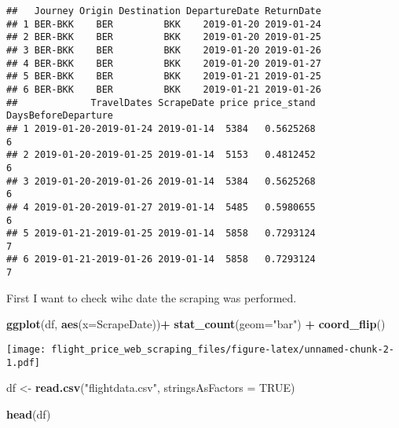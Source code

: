 \documentclass[]{article}
\newenvironment{Shaded}{\begin{snugshade}}{\end{snugshade}}
\newcommand{\KeywordTok}[1]{\textcolor[rgb]{0.13,0.29,0.53}{\textbf{#1}}}
\newcommand{\DataTypeTok}[1]{\textcolor[rgb]{0.13,0.29,0.53}{#1}}
\newcommand{\StringTok}[1]{\textcolor[rgb]{0.31,0.60,0.02}{#1}}
\newcommand{\OtherTok}[1]{\textcolor[rgb]{0.56,0.35,0.01}{#1}}
\newcommand{\OperatorTok}[1]{\textcolor[rgb]{0.81,0.36,0.00}{\textbf{#1}}}
\newcommand{\NormalTok}[1]{#1}
\begin{document}
\begin{verbatim}
##   Journey Origin Destination DepartureDate ReturnDate
## 1 BER-BKK    BER         BKK    2019-01-20 2019-01-24
## 2 BER-BKK    BER         BKK    2019-01-20 2019-01-25
## 3 BER-BKK    BER         BKK    2019-01-20 2019-01-26
## 4 BER-BKK    BER         BKK    2019-01-20 2019-01-27
## 5 BER-BKK    BER         BKK    2019-01-21 2019-01-25
## 6 BER-BKK    BER         BKK    2019-01-21 2019-01-26
##             TravelDates ScrapeDate price price_stand DaysBeforeDeparture
## 1 2019-01-20-2019-01-24 2019-01-14  5384   0.5625268                   6
## 2 2019-01-20-2019-01-25 2019-01-14  5153   0.4812452                   6
## 3 2019-01-20-2019-01-26 2019-01-14  5384   0.5625268                   6
## 4 2019-01-20-2019-01-27 2019-01-14  5485   0.5980655                   6
## 5 2019-01-21-2019-01-25 2019-01-14  5858   0.7293124                   7
## 6 2019-01-21-2019-01-26 2019-01-14  5858   0.7293124                   7
\end{verbatim}

First I want to check wihc date the scraping was performed.

\begin{Shaded}
\begin{Highlighting}[]
\KeywordTok{ggplot}\NormalTok{(df, }\KeywordTok{aes}\NormalTok{(}\DataTypeTok{x=}\NormalTok{ScrapeDate))}\OperatorTok{+}
\StringTok{  }\KeywordTok{stat_count}\NormalTok{(}\DataTypeTok{geom=}\StringTok{"bar"}\NormalTok{) }\OperatorTok{+}\StringTok{ }
\StringTok{  }\KeywordTok{coord_flip}\NormalTok{()}
\end{Highlighting}
\end{Shaded}

\texttt{[image: flight\_price\_web\_scraping\_files/figure-latex/unnamed-chunk-2-1.pdf]}

\begin{Shaded}
\begin{Highlighting}[]
\NormalTok{df <-}\StringTok{ }\KeywordTok{read.csv}\NormalTok{(}\StringTok{"flightdata.csv"}\NormalTok{, }\DataTypeTok{stringsAsFactors =} \OtherTok{TRUE}\NormalTok{)}

\KeywordTok{head}\NormalTok{(df)}
\end{Highlighting}
\end{Shaded}
\end{document}
